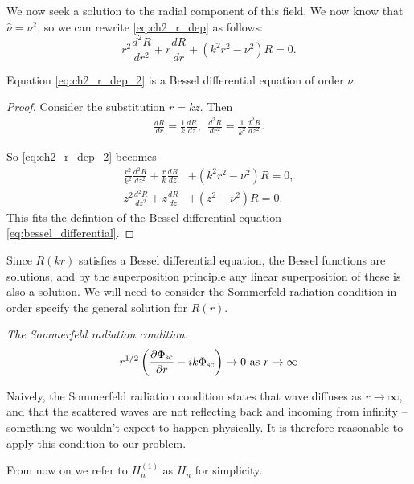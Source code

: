 We now seek a solution to the radial component of this field. We now know that $\hat{\nu} = \nu^2$, so we can rewrite \eqref{eq:ch2_r_dep} as follows:
    \begin{equation}\label{eq:ch2_r_dep_2}
        r^2 \frac{d^2 R}{dr^2} + r \frac{d R}{dr} + (k^2r^2 - \nu^2) R = 0.
    \end{equation}
    \begin{propn}
    Equation \eqref{eq:ch2_r_dep_2} is a Bessel differential equation of order $\nu$.
    \end{propn}
    \begin{proof} Consider the substitution $r=kz$. Then
        \begin{align*}
            \frac{dR}{dr} = \frac{1}{k} \frac{dR}{dz}, ~~
            \frac{d^2R}{dr^2} = \frac{1}{k^2} \frac{d^2R}{dz^2}.
        \end{align*}\par
    So \eqref{eq:ch2_r_dep_2} becomes
        \begin{align}
            \frac{r^2}{k^2}\frac{d^2R}{dz^2}
                + \frac{r}{k}\frac{dR}{dz}
                &+ (k^2r^2 - \nu^2)R = 0, \\
            z^2 \frac{d^2 R}{dz^2}
                + z \frac{dR}{dz}
                &+ (z^2 - \nu^2)R = 0.
        \end{align}
    This fits the defintion of the Bessel differential equation \eqref{eq:bessel_differential}.
    \end{proof}

Since $R(kr)$ satisfies a Bessel differential equation, the Bessel functions are solutions, and by the superposition principle any linear superposition of these is also a solution. We will need to consider the Sommerfeld radiation condition in order specify the general solution for $R(r)$.

\begin{defn}\emph{The Sommerfeld radiation condition.} \parencite{martin06scattering} \label{defn:sommerfeld_radiation_condition}
  \[ r^{1/2} \left( \frac{\partial \Phi_{\text{sc}}}{\partial r} - ik\Phi_{\text{sc}} \right) \rightarrow 0 \text{ as } r \rightarrow \infty\]
\end{defn}
Naively, the Sommerfeld radiation condition states that wave diffuses as $r\rightarrow\infty$, and that the scattered waves are not reflecting back and incoming from infinity -- something we wouldn't expect to happen physically. It is therefore reasonable to apply this condition to our problem.

From now on we refer to $H^{(1)}_n$ as $H_n$ for simplicity.

